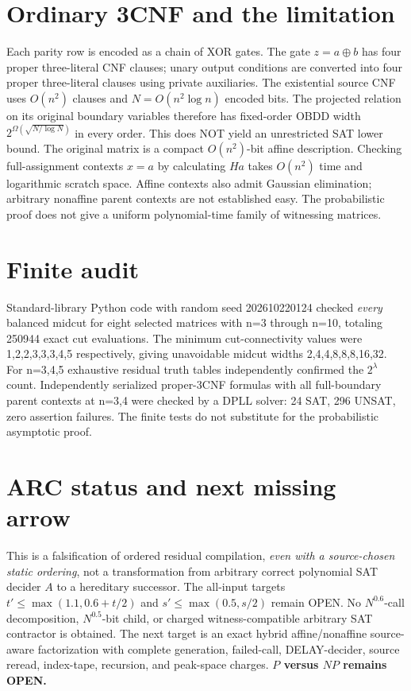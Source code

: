 \documentclass[11pt]{article}
\begin{document}
\section*{Ordinary 3CNF and the limitation}
Each parity row is encoded as a chain of XOR gates. The gate $z=a\oplus b$ has four proper three-literal CNF clauses; unary output conditions are converted into four proper three-literal clauses using private auxiliaries. The existential source CNF uses $O(n^2)$ clauses and $N=O(n^2\log n)$ encoded bits. The projected relation on its original boundary variables therefore has fixed-order OBDD width $2^{\Omega(\sqrt{N/\log N})}$ in every order. This does NOT yield an unrestricted SAT lower bound. The original matrix is a compact $O(n^2)$-bit affine description. Checking full-assignment contexts $x=a$ by calculating $Ha$ takes $O(n^2)$ time and logarithmic scratch space. Affine contexts also admit Gaussian elimination; arbitrary nonaffine parent contexts are not established easy. The probabilistic proof does not give a uniform polynomial-time family of witnessing matrices.
\section*{Finite audit}
Standard-library Python code with random seed 202610220124 checked \emph{every} balanced midcut for eight selected matrices with n=3 through n=10, totaling 250944 exact cut evaluations. The minimum cut-connectivity values were 1,2,2,3,3,3,4,5 respectively, giving unavoidable midcut widths 2,4,4,8,8,8,16,32. For n=3,4,5 exhaustive residual truth tables independently confirmed the $2^\lambda$ count. Independently serialized proper-3CNF formulas with all full-boundary parent contexts at n=3,4 were checked by a DPLL solver: 24 SAT, 296 UNSAT, zero assertion failures. The finite tests do not substitute for the probabilistic asymptotic proof.
\section*{ARC status and next missing arrow}
This is a falsification of ordered residual compilation, \emph{even with a source-chosen static ordering}, not a transformation from arbitrary correct polynomial SAT decider $A$ to a hereditary successor. The all-input targets $t'\le\max(1.1,0.6+t/2)$ and $s'\le\max(0.5,s/2)$ remain OPEN. No $N^{0.6}$-call decomposition, $N^{0.5}$-bit child, or charged witness-compatible arbitrary SAT contractor is obtained. The next target is an exact hybrid affine/nonaffine source-aware factorization with complete generation, failed-call, DELAY-decider, source reread, index-tape, recursion, and peak-space charges. \textbf{$P$ versus $NP$ remains OPEN.}
\end{document}
